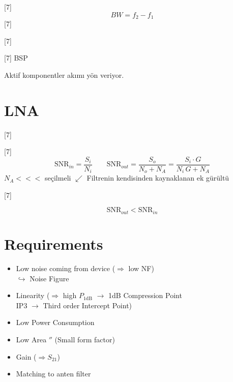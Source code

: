 \documentclass[11pt,a4paper]{article}
\begin{document}
[7]
\[ BW = f_2 - f_1 \]
[7]

[7]

[7]
BSP

Aktif komponentler akımı yön veriyor. \okunamadi{}

\section{LNA}
[7]

[7]
\[ \mathrm{SNR}_{in} = \frac{S_i}{N_i} \qquad \mathrm{SNR}_{out} = \frac{S_o}{N_o+N_A} = \frac{S_i\cdot G}{N_i\,G+N_A} \]
$N_A <<<$ seçilmeli \quad $\swarrow$ Filtrenin kendisinden kaynaklanan ek gürültü

[7]

\[ \mathrm{SNR}_{out} < \mathrm{SNR}_{in} \]

\section{Requirements}
\begin{itemize}[label=--,leftmargin=1.5em]
\item Low noise coming from device ($\Rightarrow$ low NF) \\ $\hookrightarrow$ Noise Figure
\item Linearity \quad ($\Rightarrow$ high $P_{1\mathrm{dB}}$ $\rightarrow$ 1dB Compression Point \\ \hspace*{5em} IP3 $\rightarrow$ Third order Intercept Point)
\item Low Power Consumption
\item Low Area \quad $''$ \quad (Small form factor)
\item Gain ($\Rightarrow S_{21}$)
\item Matching to anten filter
\end{itemize}
\end{document}
